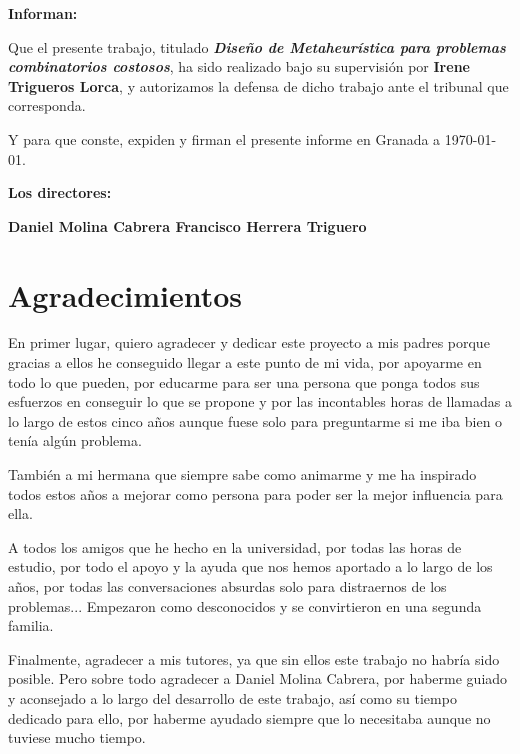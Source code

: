 \vspace{0.5cm}

\textbf{Informan:}

\vspace{0.5cm}

Que el presente trabajo, titulado \textit{\textbf{Diseño de Metaheurística para problemas combinatorios costosos}},
ha sido realizado bajo su supervisión por \textbf{Irene Trigueros Lorca}, y autorizamos la defensa de dicho trabajo ante el tribunal
que corresponda.

\vspace{0.5cm}

Y para que conste, expiden y firman el presente informe en Granada a \today.

\vspace{1cm}

\textbf{Los directores:}

\vspace{5cm}

\noindent \textbf{Daniel Molina Cabrera \hspace{5cm} Francisco Herrera Triguero}

\chapter*{Agradecimientos}
\thispagestyle{empty}

       \vspace{1cm}


En primer lugar, quiero agradecer y dedicar este proyecto a mis padres porque gracias a ellos he conseguido llegar a este punto de mi vida, por apoyarme en todo lo que pueden, por educarme para ser una persona que ponga todos sus esfuerzos en conseguir lo que se propone y por las incontables horas de llamadas a lo largo de estos cinco años aunque fuese solo para preguntarme si me iba bien o tenía algún problema. 

También a mi hermana que siempre sabe como animarme y me ha inspirado todos estos años a mejorar como persona para poder ser la mejor influencia para ella. 

A todos los amigos que he hecho en la universidad, por todas las horas de estudio, por todo el apoyo y la ayuda que nos hemos aportado a lo largo de los años, por todas las conversaciones absurdas solo para distraernos de los problemas... 
Empezaron como desconocidos y se convirtieron en una segunda familia. 

Finalmente, agradecer a mis tutores, ya que sin ellos este trabajo no habría sido posible. 
Pero sobre todo agradecer a Daniel Molina Cabrera, por haberme guiado y aconsejado a lo largo del desarrollo de este trabajo, así como su tiempo dedicado para ello, por haberme ayudado siempre que lo necesitaba aunque no tuviese mucho tiempo. 